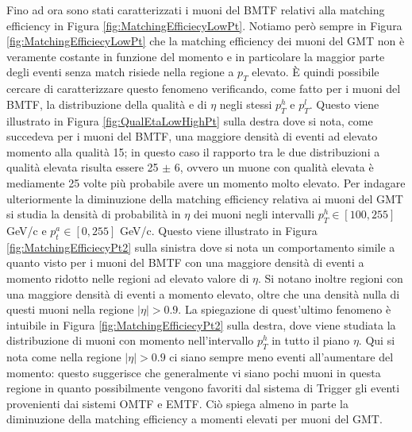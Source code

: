 Fino ad ora sono stati caratterizzati i muoni del BMTF relativi alla matching efficiency in Figura \ref{fig:MatchingEfficiecyLowPt}. Notiamo però sempre in Figura \ref{fig:MatchingEfficiecyLowPt} che la matching efficiency dei muoni del GMT non è veramente costante in funzione del momento e in particolare la maggior parte degli eventi senza match risiede nella regione a $p_T$ elevato. È quindi possibile cercare di caratterizzare questo fenomeno verificando, come fatto per i muoni del BMTF, la distribuzione della qualità e di $\eta$ negli stessi $p_T^h$ e $p_T^l$. Questo viene illustrato in Figura \ref{fig:QualEtaLowHighPt} sulla destra dove si nota, come succedeva per i muoni del BMTF, una maggiore densità di eventi ad elevato momento alla qualità 15; in questo caso il rapporto tra le due distribuzioni a qualità elevata risulta essere 25 $\pm$ 6, ovvero un muone con qualità elevata è mediamente 25 volte più probabile avere un momento molto elevato. \newline
Per indagare ulteriormente la diminuzione della matching efficiency relativa ai muoni del GMT si studia la densità di probabilità in $\eta$ dei muoni negli intervalli $p_T^h \in [100, 255]$ GeV/c e $p_t^a \in [0, 255]$ GeV/c. Questo viene illustrato in Figura \ref{fig:MatchingEfficiecyPt2} sulla sinistra dove si nota un comportamento simile a quanto visto per i muoni del BMTF con una maggiore densità di eventi a momento ridotto nelle regioni ad elevato valore di $\eta$. Si notano inoltre regioni con una maggiore densità di eventi a momento elevato, oltre che una densità nulla di questi muoni nella regione $|\eta| > 0.9$. La spiegazione di quest'ultimo fenomeno è intuibile in Figura \ref{fig:MatchingEfficiecyPt2} sulla destra, dove viene studiata la distribuzione di muoni con momento nell'intervallo $p_T^h$ in tutto il piano $\eta$. Qui si nota come nella regione $|\eta| > 0.9$ ci siano sempre meno eventi all'aumentare del momento: questo suggerisce che generalmente vi siano pochi muoni in questa regione in quanto possibilmente vengono favoriti dal sistema di Trigger gli eventi provenienti dai sistemi OMTF e EMTF. 
Ciò spiega almeno in parte la diminuzione della matching efficiency a momenti elevati per muoni del GMT.





